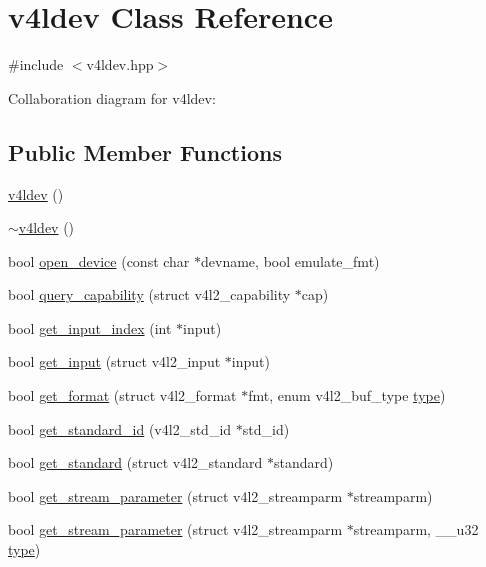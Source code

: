 \hypertarget{classv4ldev}{}\section{v4ldev Class Reference}
\label{classv4ldev}


{\ttfamily \#include $<$v4ldev.\+hpp$>$}



Collaboration diagram for v4ldev\+:
\subsection*{Public Member Functions}
\begin{DoxyCompactItemize}
\item 
\hyperlink{classv4ldev_a54f840014fd707c2508efcc7a21d031e}{v4ldev} ()
\item 
\hyperlink{classv4ldev_ab65f03847a5dcd1f19bcfe33f391740f}{$\sim$v4ldev} ()
\item 
bool \hyperlink{classv4ldev_a56dc3abadfc1de069eb973ff4a6dbd1f}{open\+\_\+device} (const char $\ast$devname, bool emulate\+\_\+fmt)
\item 
bool \hyperlink{classv4ldev_aee765379811b24150d5a591340d9568d}{query\+\_\+capability} (struct v4l2\+\_\+capability $\ast$cap)
\item 
bool \hyperlink{classv4ldev_adb85ceff191f9d0ebc65239c6c8d5e42}{get\+\_\+input\+\_\+index} (int $\ast$input)
\item 
bool \hyperlink{classv4ldev_a517ba36f366611d3cd72c8edb5cddd1f}{get\+\_\+input} (struct v4l2\+\_\+input $\ast$input)
\item 
bool \hyperlink{classv4ldev_a001ffb48bb1981b038ed6878b148a18e}{get\+\_\+format} (struct v4l2\+\_\+format $\ast$fmt, enum v4l2\+\_\+buf\+\_\+type \hyperlink{classstd_1_1conditional_1_1type}{type})
\item 
bool \hyperlink{classv4ldev_a4d296d91d189e8600e298771ae5016b2}{get\+\_\+standard\+\_\+id} (v4l2\+\_\+std\+\_\+id $\ast$std\+\_\+id)
\item 
bool \hyperlink{classv4ldev_a76f01fd5ac53c94bca14cfbb13c57f71}{get\+\_\+standard} (struct v4l2\+\_\+standard $\ast$standard)
\item 
bool \hyperlink{classv4ldev_ab8ab5bfdaf0ffe3bcf6638dc7465494b}{get\+\_\+stream\+\_\+parameter} (struct v4l2\+\_\+streamparm $\ast$streamparm)
\item 
bool \hyperlink{classv4ldev_a8893fba1f5915c2b9a8f6aa6c1e71c52}{get\+\_\+stream\+\_\+parameter} (struct v4l2\+\_\+streamparm $\ast$streamparm, \+\_\+\+\_\+u32 \hyperlink{classstd_1_1conditional_1_1type}{type})

\end{DoxyCompactItemize}
